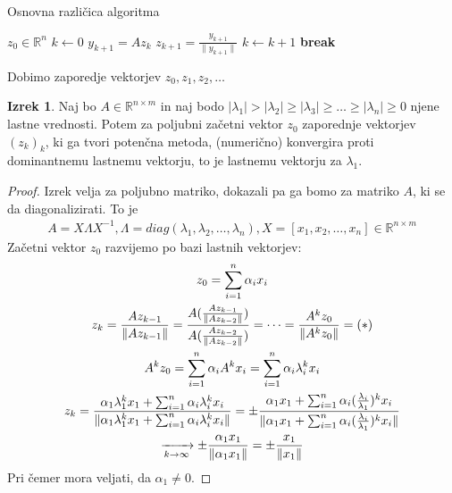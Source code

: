 \documentclass[a4paper,12pt]{article}
\DeclarePairedDelimiter\norm{\lVert}{\rVert}
\theoremstyle{definition}
\newtheorem{theorem}[counter]{Izrek}
\theoremstyle{remark}
\newcommand{\R}{\mathbb{R}}
\begin{document}

\begin{algorithm}
    \caption{Osnovna različica algoritma}
    \begin{algorithmic}[1]
        \State $z_0 \in \mathbb{R}^n$
        \State $k \gets 0$
            \State $y_{k+1} = A z_k$
            \State $z_{k+1} = \frac{y_{k+1}}{\|y_{k+1}\|}$
            \State $k \gets k + 1$
             
                \State \textbf{break}
            \EndIf
        \EndWhile
    \end{algorithmic}
\end{algorithm}

Dobimo zaporedje vektorjev $z_0, z_1, z_2, \dots$

\begin{theorem}
    Naj bo $A \in \R^{n \times m}$ in naj bodo $|\lambda_1| > |\lambda_2| \geq |\lambda_3| \geq \dots \geq |\lambda_n| \geq 0$ njene lastne vrednosti.
    Potem za poljubni začetni vektor $z_0$ zaporednje vektorjev $(z_k)_k$, ki ga tvori potenčna metoda, (numerično) konvergira proti dominantnemu lastnemu 
    vektorju, to je lastnemu vektorju za $\lambda_1$.
\end{theorem}

\begin{proof}
    Izrek velja za poljubno matriko, dokazali pa ga bomo za matriko $A$, ki se da diagonalizirati. To je
    \begin{gather*}
        A = X \Lambda X^{-1}, \Lambda = diag(\lambda_1, \lambda_2, \dots, \lambda_n), X = [x_1, x_2, \dots, x_n] \in \R^{n \times m}
    \end{gather*}
    Začetni vektor $z_0$ razvijemo po bazi lastnih vektorjev:
    \begin{gather*}
        z_0 = \sum_{i = 1}^{n} \alpha_i x_i \\
        z_k = \frac{A z_{k-1}}{\norm{A z_{k-1}}} = \frac{A (\frac{A z_{k-1}}{\norm{A z_{k-2}}})}{A (\frac{A z_{k-2}}{\norm{A z_{k-2}}})} = \dots = \frac{A^k z_0}{\norm{A^k z_0}} = (*) \\ 
        A^k z_0 = \sum_{i=1}^{n} \alpha_i A^k x_i = \sum_{i=1}^{n} \alpha_i \lambda_i^k x_i \\
        z_k = \frac{\alpha_1 \lambda_1^k x_1 + \sum_{i=1}^{n}\alpha_i \lambda_i^k x_i}{\norm{\alpha_1 \lambda_1^k x_1 + \sum_{i=1}^{n}\alpha_i \lambda_i^k x_i}} = \pm \frac{\alpha_1 x_1 + \sum_{i=1}^{n}\alpha_i (\frac{\lambda_i}{\lambda_1})^k x_i}{\norm{\alpha_1 x_1 + \sum_{i=1}^{n}\alpha_i (\frac{\lambda_i}{\lambda_1})^k x_i}} \\
        \xrightarrow[k \to \infty]{} \pm \frac{\alpha_1 x_1}{\norm{\alpha_1 x_1}} = \pm \frac{x_1}{\norm{x_1}}
    \end{gather*}
    Pri čemer mora veljati, da $\alpha_1 \neq 0$.
\end{proof}
\end{document}
